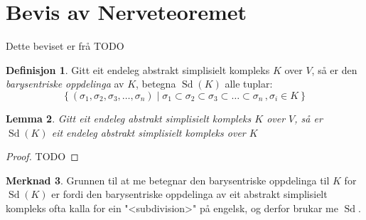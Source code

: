 \documentclass[a4paper, titlepage, 12pt, norsk]{article}
\theoremstyle{plain}
\newtheorem{theorem}{Teorem}[section]
\newtheorem{lemma}[theorem]{Lemma}
\theoremstyle{definition}
\newtheorem{definition}[theorem]{Definisjon}
\newtheorem{remark}[theorem]{Merknad}
\newcommand{\Nc}{\mathcal{N}}
\newcommand{\intersect}{ \mathop{\cap}\limits } %
\newcommand{\gr}[1]{ \lvert #1 \rvert } %
\newcommand{\set}[1]{ \left \{ #1 \right \} } %
\DeclareMathOperator{\Sd}{Sd}
\begin{document}
%	

%
%

\section{Bevis av Nerveteoremet}

Dette beviset er frå TODO

\begin{definition}
	Gitt eit endeleg abstrakt simplisielt kompleks \( K \) over \( V \), så er den \emph{barysentriske oppdelinga} av \( K \), betegna \( \Sd(K) \) alle tuplar: 
	\[
		\set{(\sigma_1, \sigma_2, \sigma_3, \dots, \sigma_n) \mid \sigma_1 \subset \sigma_2 \subset \sigma_3 \subset \dots \subset \sigma_n\,, \sigma_i \in K}
	\]
\end{definition}

\begin{lemma}
	Gitt eit endeleg abstrakt simplisielt kompleks \( K \) over \( V \), så er \( \Sd(K) \) eit endeleg abstrakt simplisielt kompleks over \( K \)
\end{lemma}

\begin{proof} \label{thm:subdivisjon-abstrakt-simplisielt-kompleks}
	TODO
\end{proof}

\begin{remark}
	Grunnen til at me betegnar den barysentriske oppdelinga til \( K \) for \( \Sd(K) \) er fordi den barysentriske oppdelinga av eit abstrakt simplisielt kompleks ofta kalla for ein "<subdivision>" på engelsk, og derfor brukar me \( \Sd \).
\end{remark}
\end{document}
